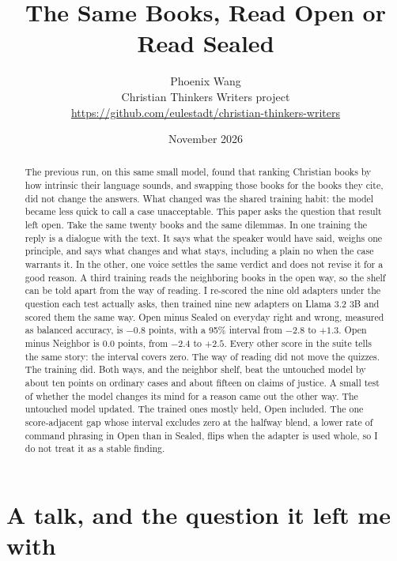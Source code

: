 \documentclass[11pt]{article}
\title{The Same Books, Read Open or Read Sealed}
\author{Phoenix Wang\\
\small Christian Thinkers Writers project\\
\small \url{https://github.com/eulestadt/christian-thinkers-writers}}
\date{November 2026}
\begin{document}
\maketitle

\begin{abstract}
The previous run, on this same small model, found that ranking Christian books by how intrinsic their language sounds, and swapping those books for the books they cite, did not change the answers. What changed was the shared training habit: the model became less quick to call a case unacceptable. This paper asks the question that result left open. Take the same twenty books and the same dilemmas. In one training the reply is a dialogue with the text. It says what the speaker would have said, weighs one principle, and says what changes and what stays, including a plain no when the case warrants it. In the other, one voice settles the same verdict and does not revise it for a good reason. A third training reads the neighboring books in the open way, so the shelf can be told apart from the way of reading. I re-scored the nine old adapters under the question each test actually asks, then trained nine new adapters on Llama 3.2 3B and scored them the same way. Open minus Sealed on everyday right and wrong, measured as balanced accuracy, is $-0.8$ points, with a 95\% interval from $-2.8$ to $+1.3$. Open minus Neighbor is $0.0$ points, from $-2.4$ to $+2.5$. Every other score in the suite tells the same story: the interval covers zero. The way of reading did not move the quizzes. The training did. Both ways, and the neighbor shelf, beat the untouched model by about ten points on ordinary cases and about fifteen on claims of justice. A small test of whether the model changes its mind for a reason came out the other way. The untouched model updated. The trained ones mostly held, Open included. The one score-adjacent gap whose interval excludes zero at the halfway blend, a lower rate of command phrasing in Open than in Sealed, flips when the adapter is used whole, so I do not treat it as a stable finding.
\end{abstract}

\section{A talk, and the question it left me with}
\end{document}
